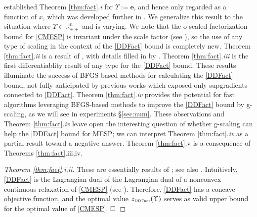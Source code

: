 \documentclass[smallextended]{svjour3hack}       %
\begin{document}
\begin{remark}
\cite{nikolov2015randomized} established Theorem \ref{thm:fact}.\emph{i} for $\Upsilon:=\mathbf{e}$, and hence only regarded as a function of $x$, which was developed further in \cite{li2020best}. We generalize this result to the situation where $\Upsilon\in \mathbb{R}^n_{++}$ and is varying.
We note that the o-scaled factorization bound for \ref{CMESP} is
invariant under the scale factor (see \cite{chen2023computing}), so the
use of any type of scaling in the context of the \ref{DDFact} bound is completely new.
Theorem \ref{thm:fact}.\emph{ii} is a result of \cite{nikolov2015randomized}, with details filled in by \cite[Section 3.4.2]{FLbook}.
Theorem \ref{thm:fact}.\emph{iii} is the first differentiablity result of any type for the
\ref{DDFact} bound.
These results illuminate the success of  BFGS-based methods for calculating the \ref{DDFact} bound, not fully anticipated by previous works which exposed only supgradients connected to   \ref{DDFact}.
Theorem \ref{thm:fact}.\emph{iv} provides the potential for fast algorithms leveraging BFGS-based methods to improve the \ref{DDFact} bound by g-scaling, as we will see in experiments \S\ref{sec:num}.
These observations and Theorem \ref{thm:fact}.\emph{iv} leave open
the interesting question of whether g-scaling can help
the \ref{DDFact} bound for \hyperlink{MESP}{MESP};
we can interpret Theorem \ref{thm:fact}.\emph{iv} as a partial result toward a negative answer. Theorem \ref{thm:fact}.v is a consequence of Theorems \ref{thm:fact}.iii,iv.
\end{remark}

\begin{proof}[Theorem \ref{thm:fact}.i,ii]

    These are essentially  results of \cite{nikolov2015randomized}; see also \cite[Section 3.4]{FLbook}. Intuitively, \ref{DDFact} is the Lagrangian dual of the Lagrangian dual of a nonconvex continuous relaxation of \ref{CMESP} (see \cite{chen2023computing}). Therefore, \ref{DDFact} has a concave objective function, and
    the optimal value $z_{{\tiny\mbox{DDFact}}} (\Upsilon)$ serves as valid upper bound for the optimal value of \ref{CMESP}.
    $\hfill \square$

\end{proof}
\end{document}

